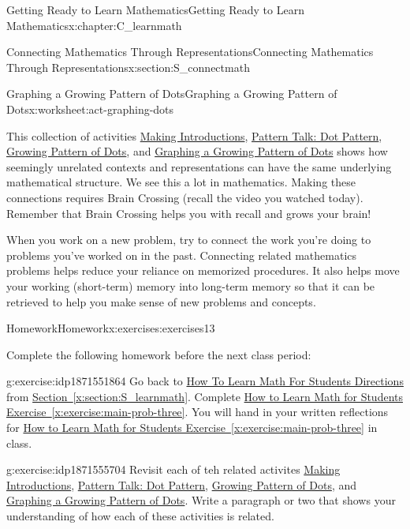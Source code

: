 \documentclass[oneside,10pt,]{book}
\newcommand{\xreffont}{\relax}
\numberwithin{equation}{chapter}
\begin{document}
\begin{chapterptx}{Getting Ready to Learn Mathematics}{}{Getting Ready to Learn Mathematics}{}{}{x:chapter:C_learnmath}
\begin{sectionptx}{Connecting Mathematics Through Representations}{}{Connecting Mathematics Through Representations}{}{}{x:section:S_connectmath}
\begin{worksheet-subsection}{Graphing a Growing Pattern of Dots}{}{Graphing a Growing Pattern of Dots}{}{}{x:worksheet:act-graphing-dots}
\begin{conclusion}{}
This collection of activities \textendash{} \hyperref[x:activity:act-introductions]{Making Introductions}, \hyperref[x:subsection:SS_dot_pattern]{Pattern Talk: Dot Pattern}, \hyperref[x:worksheet:act-growing-dots]{Growing Pattern of Dots}, and \hyperref[x:worksheet:act-graphing-dots]{Graphing a Growing Pattern of Dots} \textendash{} shows how seemingly unrelated contexts and representations can have the same underlying mathematical structure. We see this a lot in mathematics. Making these connections requires Brain Crossing (recall the video you watched today). Remember that Brain Crossing helps you with recall and grows your brain!%
\par
When you work on a new problem, try to connect the work you're doing to problems you've worked on in the past. Connecting related mathematics problems helps reduce your reliance on memorized procedures. It also helps move your working (short-term) memory into long-term memory so that it can be retrieved to help you make sense of new problems and concepts.%
\end{conclusion}%
\end{worksheet-subsection}
\restoregeometry
%
%
\typeout{************************************************}
\typeout{************************************************}
%
\begin{exercises-subsection}{Homework}{}{Homework}{}{}{x:exercises:exercises13}
\begin{introduction}{}%
Complete the following homework before the next class period:%
\end{introduction}%
\begin{divisionexercise}{1}{}{}{g:exercise:idp1871551864}%
Go back to \hyperlink{x:paragraphs:htlmfs-directions}{How To Learn Math For Students Directions} from \hyperref[x:section:S_learnmath]{Section~{\xreffont\ref{x:section:S_learnmath}}}. Complete \hyperref[x:exercise:main-prob-three]{How to Learn Math for Students Exercise~{\xreffont\ref{x:exercise:main-prob-three}}}. You will hand in your written reflections for \hyperref[x:exercise:main-prob-three]{How to Learn Math for Students Exercise~{\xreffont\ref{x:exercise:main-prob-three}}} in class.%
\end{divisionexercise}%
\begin{divisionexercise}{2}{}{}{g:exercise:idp1871555704}%
Revisit each of teh related activites \hyperref[x:activity:act-introductions]{Making Introductions}, \hyperref[x:subsection:SS_dot_pattern]{Pattern Talk: Dot Pattern}, \hyperref[x:worksheet:act-growing-dots]{Growing Pattern of Dots}, and \hyperref[x:worksheet:act-graphing-dots]{Graphing a Growing Pattern of Dots}. Write a paragraph or two that shows your understanding of how each of these activities is related.%

\end{divisionexercise}
\end{exercises-subsection}
\end{sectionptx}
\end{chapterptx}
\end{document}
